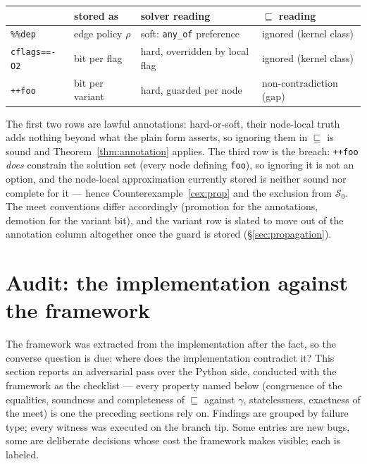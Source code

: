 \documentclass[11pt]{article}
\theoremstyle{definition}
\theoremstyle{remark}
\newcommand{\sat}{\sqsubseteq}
\newcommand{\Spec}{\mathcal{S}}
\newcommand{\code}[1]{\texttt{#1}}
\begin{document}
\begin{center}
\begin{tabular}{@{}llll@{}}
\toprule
 & stored as & solver reading & $\sat$ reading \\
\midrule
\code{\%\%dep} & edge policy $\rho$ & soft: \code{any\_of} preference & ignored (kernel class) \\
\code{cflags==-O2} & bit per flag & hard, overridden by local flag & ignored (kernel class) \\
\code{++foo} & bit per variant & hard, guarded per node & non-contradiction (gap) \\
\bottomrule
\end{tabular}
\end{center}

\noindent
The first two rows are lawful annotations: hard-or-soft, their node-local
truth adds nothing beyond what the plain form asserts, so ignoring them in
$\sat$ is sound and Theorem~\ref{thm:annotation} applies.  The third row is
the breach: \code{++foo} \emph{does} constrain the solution set (every node
defining \code{foo}), so ignoring it is not an option, and the node-local
approximation currently stored is neither sound nor complete for it ---
hence Counterexample~\ref{cex:prop} and the exclusion from $\Spec_0$.  The
meet conventions differ accordingly (promotion for the annotations,
demotion for the variant bit), and the variant row is slated to move out of
the annotation column altogether once the guard is stored
(\S\ref{sec:propagation}).

\section{Audit: the implementation against the framework}\label{sec:audit}

The framework was extracted from the implementation after the fact, so the
converse question is due: where does the implementation contradict it?  This
section reports an adversarial pass over the Python side, conducted with the
framework as the checklist --- every property named below (congruence of the
equalities, soundness and completeness of $\sat$ against $\gamma$,
statelessness, exactness of the meet) is one the preceding sections rely on.
Findings are grouped by failure type; every witness was executed on the
branch tip.  Some entries are new bugs, some are deliberate decisions whose
cost the framework makes visible; each is labeled.
\end{document}
